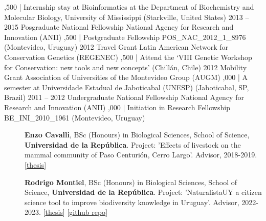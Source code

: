 \documentclass[9pt]{developercv} %
\begin{document}
\begin{entrylist}
		{,500 | Internship stay at Bioinformatics at the Department of Biochemistry and Molecular Biology, University of Mississippi (Starkville, United States)}
	\entry
		{2013 -- 2015}
		{Posgraduate National Fellowship}
		{National Agency for Research and Innovation (ANII)}
		{,500 | Postgraduate Fellowship POS\_NAC\_2012\_1\_8976 (Montevideo, Uruguay)}
	\entry
		{2012}
		{Travel Grant}
		{Latin American Network for Conservation Genetics (REGENEC)}
		{,500 | Attend the ‘VIII Genetic Workshop for Conservation: new tools and new concepts’ (Chillán, Chile)}
	\entry
		{2012}
		{Mobility Grant}
		{Association of Universities of the Montevideo Group (AUGM)}
		{,000 | A semester at Universidade Estadual de Jaboticabal (UNESP) (Jaboticabal, SP, Brazil)}
	\entry
		{2011 -- 2012}
		{Undergraduate National Fellowship}
		{National Agency for Research and Innovation (ANII)}
		{,000 | Initiation in Research Fellowship BE\_INI\_2010\_1961 (Montevideo, Uruguay)}

\end{entrylist}



\begin{description}
\item[]{\bf Enzo Cavalli}, BSc (Honours) in Biological Sciences, School of Science, {\bf Universidad de la Rep\'{u}blica}. Project: 'Effects of livestock on the mammal community of Paso Centurión, Cerro Largo'. Advisor, 2018-2019.  [\href{https://www.colibri.udelar.edu.uy/jspui/bitstream/20.500.12008/23484/6/uy24-19703.pdf}{thesis}]
\item[]{\bf Rodrigo Montiel}, BSc (Honours) in Biological Sciences, School of Science, {\bf Universidad de la Rep\'{u}blica}. Project: 'NaturalistaUY a citizen science tool to improve biodiversity knowledge in Uruguay'. Advisor, 2022-2023. [\href{https://www.colibri.udelar.edu.uy/jspui/bitstream/20.500.12008/42167/1/uy24-20995.pdf}{thesis}] [\href{https://github.com/Rodrigo-Montiel/TesisNaturalistaUY}{github repo}]
\end{description}


\end{document}
